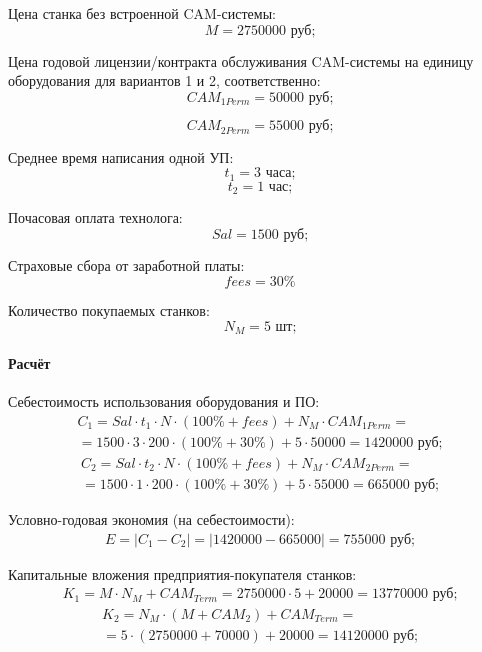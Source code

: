 Цена станка без встроенной CAM-системы:
\[M=2750000 \text{ руб;}\]

Цена годовой лицензии/контракта обслуживания CAM-системы на единицу оборудования для вариантов 1 и 2, соответственно:
\[{CAM}_{1Perm}=50000 \text{ руб;}\]

\[{CAM}_{2Perm}=55000 \text{ руб;}\]

Среднее время написания одной УП:
\[t_1=3 \text{ часа;}\]
\[t_2=1 \text{ час;}\]

Почасовая оплата технолога:
\[Sal=1500 \text{ руб;}\]

Страховые сбора от заработной платы:
\[fees=30\%\]

Количество покупаемых станков:
\[N_M=5 \text{ шт;}\]

\paragraph{Расчёт}\label{par:ecocalc}
\nopagebreak

Себестоимость использования оборудования и ПО:
\begin{equation}
	\begin{aligned}
		C_1 = Sal \cdot t_1\cdot N \cdot(100\%+fees)+N_M \cdot CAM_{1Perm} =\\= 1500 \cdot 3 \cdot 200 \cdot (100\%+30\%)+5 \cdot 50000=1 420 000 \text{ руб;}
	\end{aligned}
\end{equation}
\begin{equation}
	\begin{aligned}
		C_2 = Sal \cdot t_2\cdot N \cdot(100\%+fees)+N_M \cdot CAM_{2Perm} =\\= 1500 \cdot 1 \cdot 200 \cdot (100\%+30\%)+5 \cdot 55000=665 000 \text{ руб;}
	\end{aligned}
\end{equation}

Условно-годовая экономия (на себестоимости):
\begin{equation}
	\begin{aligned}
		E=|C_1-C_2|=|1420000-665000|=755 000 \text{ руб;}
	\end{aligned}
\end{equation}

Капитальные вложения предприятия-покупателя станков:
\begin{equation}
	\begin{aligned}
		K_1=M \cdot N_M+{CAM}_{Term}=2750000 \cdot 5+20000=13 770 000 \text{ руб;}
	\end{aligned}
\end{equation}
\begin{equation}
	\begin{aligned}
		K_2=N_M \cdot (M+{CAM}_2)+{CAM}_{Term}=\\=5 \cdot (2750000+70000)+20000 = 14 120 000 \text{ руб;}
	\end{aligned}
\end{equation}

